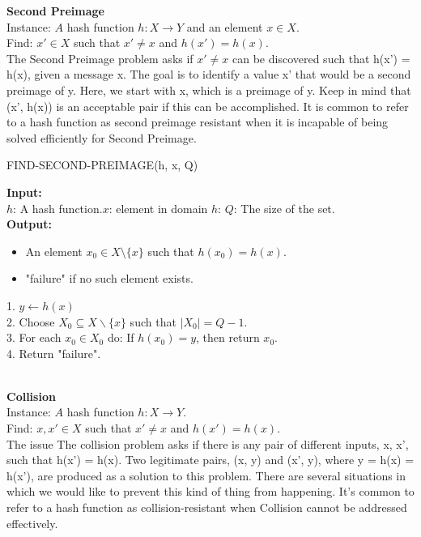 \documentclass[11pt]{article}
\begin{document}
\textbf{Second Preimage}\\
Instance: $A$ hash function $h : X \rightarrow Y$ and an element $x \in X.$\\
Find: $x' \in X$ such that $x' \neq x$ and $h(x') = h(x).$\\
The Second Preimage problem asks if $x' \neq x$ can be discovered such that h(x') = h(x), given a message x. The goal is to identify a value x' that would be a second preimage of y. Here, we start with x, which is a preimage of y. Keep in mind that (x', h(x)) is an acceptable pair if this can be accomplished. It is common to refer to a hash function as second preimage resistant when it is incapable of being solved efficiently for Second Preimage.\\
\begin{algorithm}
\caption{FIND-SECOND-PREIMAGE(h, x, Q)}
\label{alg:find-second-preimage}
\textbf{Input:}\\
     $h$: A hash function.\hspace{5pt}$x$: element in domain $h$:
     \hspace{5pt}$Q$: The size of the set.\\
\textbf{Output:}
\begin{itemize}
    \item An element $x_0 \in X \setminus \{x\}$ such that $h(x_0) = h(x)$.
    \item "failure" if no such element exists.
\end{itemize}
1. $y \leftarrow h(x)$\\
2. Choose $X_0 \subseteq X \backslash \{x\}$ such that $|X_0| = Q-1$.\\
3. For each $x_0 \in X_0$ do:
         If $h(x_0) = y$, then return $x_0$.\\   
4. Return "failure".
\end{algorithm}\\
\textbf{Collision}\\
Instance: $A$ hash function $h : X \rightarrow Y.$\\
Find: $x, x' \in X$ such that $x' \neq x$ and $h(x') = h(x).$\\
The issue The collision problem asks if there is any pair of different inputs, x, x', such that h(x') = h(x).  Two legitimate pairs, (x, y) and (x', y), where y = h(x) = h(x'), are produced as a solution to this problem. There are several situations in which we would like to prevent this kind of thing from happening. It's common to refer to a hash function as collision-resistant when Collision cannot be addressed effectively.\\
\end{document}
